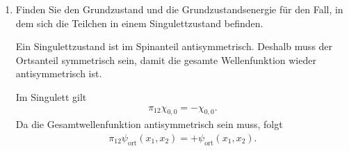 \documentclass[11pt,a4paper]{scrartcl}
\newcommand{\eps}{\varepsilon}
\newcommand{\Pex}{\pi_{12}}
\begin{document}
\begin{enumerate}[label=(\alph*)]
\begin{calculationbox}
            \begin{calculationbox}[title=Grundzustandsenergie]
                Die Energie ist die Summe der besetzten Einteilchenenergien:
                \begin{align*}
                    E_T^{(0)}
                    &=\eps_1+\eps_2\\
                    &=\frac{\hbar^2\pi^2}{2mL^2}
                    +
                    \frac{4\hbar^2\pi^2}{2mL^2}\\
                    &=\frac{5\hbar^2\pi^2}{2mL^2}.
                \end{align*}

                \begin{solutionbox}[title=Triplett-Grundzustand]
                    \begin{align*}
                        \Psi_{T,M}(x_1,x_2)
                        =
                        \psi_A(x_1,x_2)\chi_{1,M},
                        \qquad
                        E_T^{(0)}=\frac{5\hbar^2\pi^2}{2mL^2}.
                    \end{align*}
                \end{solutionbox}
            \end{calculationbox}
        \end{calculationbox}

        \item Finden Sie den Grundzustand und die Grundzustandsenergie für den Fall, in dem sich die Teilchen in einem Singulettzustand befinden.

        \begin{calculationbox}
            Ein Singulettzustand ist im Spinanteil antisymmetrisch. Deshalb muss der Ortsanteil symmetrisch sein, damit die gesamte Wellenfunktion wieder antisymmetrisch ist.

            \begin{calculationbox}[title=Symmetriebedingung]
                Im Singulett gilt
                \begin{align*}
                    \Pex\chi_{0,0}=-\chi_{0,0}.
                \end{align*}
                Da die Gesamtwellenfunktion antisymmetrisch sein muss, folgt
                \begin{align*}
                    \Pex\psi_{\mathrm{ort}}(x_1,x_2)=+\psi_{\mathrm{ort}}(x_1,x_2).
                \end{align*}
            \end{calculationbox}


\end{calculationbox}
\end{enumerate}
\end{document}
